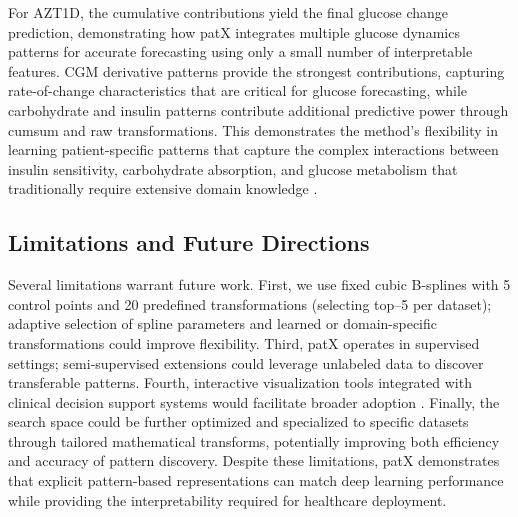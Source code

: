 \documentclass[11pt]{article}
\begin{document}
For AZT1D, the cumulative contributions yield the final glucose change prediction,
demonstrating how patX integrates multiple glucose dynamics patterns for accurate
forecasting using only a small number of interpretable features.
CGM derivative patterns provide the strongest contributions, capturing rate-of-change
characteristics that are critical for glucose forecasting, while carbohydrate and insulin
patterns contribute additional predictive power through cumsum and raw transformations.
This demonstrates the method's flexibility in learning patient-specific patterns
that capture the complex interactions between insulin sensitivity, carbohydrate
absorption, and glucose metabolism that traditionally require extensive domain
knowledge \cite{woldaregay2019data, oviedo2017review}.

\subsection{Limitations and Future Directions}

Several limitations warrant future work.
First, we use fixed cubic B-splines with 5 control points and 20 predefined
transformations (selecting top--5 per dataset); adaptive selection of spline
parameters and learned or domain-specific transformations could improve flexibility.
Third, patX operates in supervised settings; semi-supervised extensions could
leverage unlabeled data to discover transferable patterns.
Fourth, interactive visualization tools integrated with clinical decision
support systems would facilitate broader adoption \cite{tonekaboni2019clinicians}.
Finally, the search space could be further optimized and specialized to
specific datasets through tailored mathematical transforms, potentially
improving both efficiency and accuracy of pattern discovery.
Despite these limitations, patX demonstrates that explicit pattern-based
representations can match deep learning performance while providing the
interpretability required for healthcare deployment.
\end{document}
